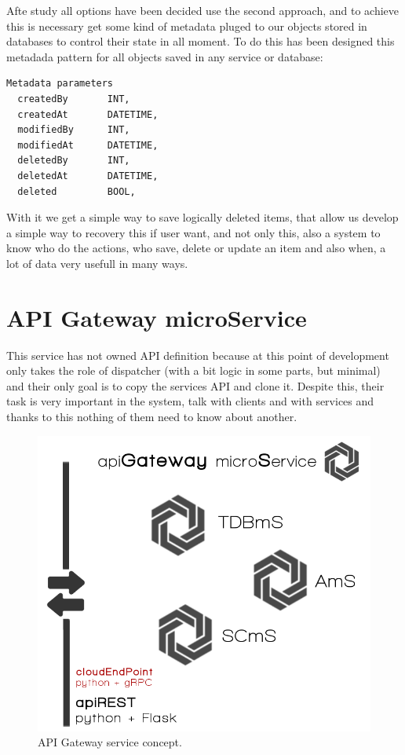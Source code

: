 \noindent Afte study all options have been decided use the second approach, and to achieve
this is necessary get some kind of metadata pluged to our objects stored in databases
to control their state in all moment.
To do this has been designed this metadada pattern for all objects saved in any
service or database:

\begin{lstlisting}[language=python,frame=none]
  Metadata parameters
  createdBy       INT,
  createdAt       DATETIME,
  modifiedBy      INT,
  modifiedAt      DATETIME,
  deletedBy       INT,
  deletedAt       DATETIME,
  deleted         BOOL,

\end{lstlisting}

With it we get a simple way to save logically deleted items, that allow us
develop a simple way to recovery this if user want, and not only this, also
a system to know who do the actions, who save, delete or update an item and
also when, a lot of data very usefull in many ways.


\section{API Gateway microService}

This service has not owned API definition because at this point of development
only takes the role of dispatcher (with a bit logic in some parts, but minimal)
and their only goal is to copy the services API and clone it. Despite this, their
task is very important in the system, talk with clients and with services and thanks
to this nothing of them need to know about another.

\begin{figure}[H]
  \includegraphics[scale=0.35]{img/graphics/apigateway.png}
  \centering
  \caption{API Gateway service concept.}
\end{figure}

